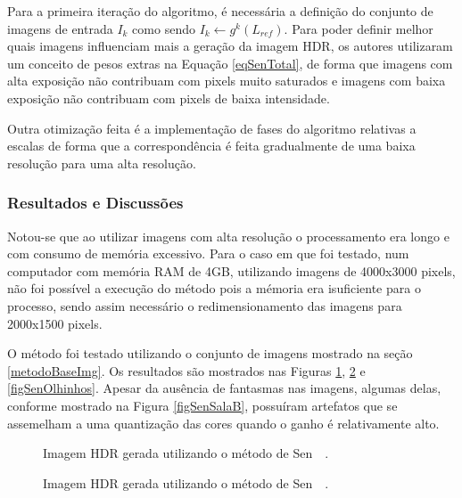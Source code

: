 Para a primeira iteração do algoritmo, é necessária a definição do conjunto de imagens de entrada ${I_k}$ como sendo $I_k \leftarrow g^k(L_{ref})$. Para poder definir melhor quais imagens influenciam mais a geração da imagem HDR, os autores utilizaram um conceito de pesos extras na Equação \ref{eqSenTotal}, de forma que imagens com alta exposição não contribuam com pixels muito saturados e imagens com baixa exposição não contribuam com pixels de baixa intensidade.

Outra otimização feita é a implementação de fases do algoritmo relativas a escalas de forma que a correspondência é feita gradualmente de uma baixa resolução para uma alta resolução.

\subsubsection{Resultados e Discussões} \label{MetodoSenResultado}

Notou-se que ao utilizar imagens com alta resolução o processamento era longo e com consumo de memória excessivo. Para o caso em que foi testado, num computador com memória RAM de 4GB, utilizando imagens de 4000x3000 pixels, não foi possível a execução do método pois a mémoria era isuficiente para o processo, sendo assim necessário o redimensionamento das imagens para 2000x1500 pixels.

O método foi testado utilizando o conjunto de imagens mostrado na seção \ref{metodoBaseImg}. Os resultados são mostrados nas Figuras \ref{figSenSala}, \ref{figSenPorquinho} e \ref{figSenOlhinhos}. Apesar da ausência de fantasmas nas imagens, algumas delas, conforme mostrado na Figura \ref{figSenSalaB}, possuíram artefatos que se assemelham a uma quantização das cores quando o ganho é relativamente alto.

\begin{figure}[H]
  \centering
  \quad %
  \caption{Imagem HDR gerada utilizando o método de Sen~\etal~\protect\cite{hdrMovimento}.}
  \label{figSenSala}
\end{figure}

\begin{figure}[H]
  \centering
  \quad %
  \caption{Imagem HDR gerada utilizando o método de Sen~\etal~\protect\cite{hdrMovimento}.}
  \label{figSenPorquinho}
\end{figure}

